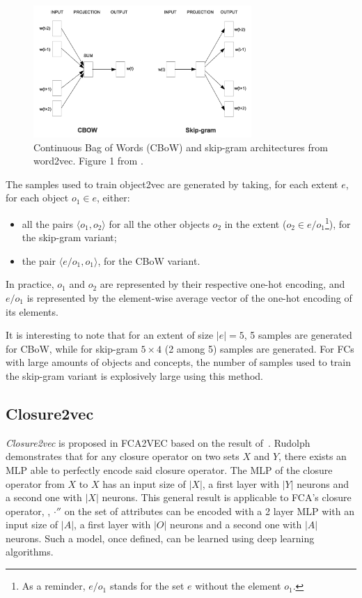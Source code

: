 \begin{figure}
    \centering
    \includegraphics[width=.9\textwidth, height=5cm, keepaspectratio]{Figures/Ch2/word2vec.png}
    \caption{Continuous Bag of Words (CBoW) and skip-gram architectures from word2vec. Figure 1 from \cite{word2vec:2013:mikolov}.}
    \label{fig:w2v}
\end{figure}

The samples used to train {object2vec} are generated by taking, for each extent $e$, for each object $o_1\in e$, either:
\begin{itemize}
    \item all the pairs $\langle o_1, o_2 \rangle$ for all the other objects $o_2$ in the extent ($o_2 \in e/o_1$\footnote{As a reminder, $e/o_1$ stands for the set $e$ without the element $o_1$.\label{fn:e-less-o}}), for the {skip-gram} variant;
    \item the pair $\langle e/o_1, o_1 \rangle$, for the {CBoW} variant.
\end{itemize}
In practice, $o_1$ and $o_2$ are represented by their respective one-hot encoding, and $e/o_1$ is represented by the element-wise average vector of the one-hot encoding of its elements.

It is interesting to note that for an extent of size $|e| = 5$, 5 samples are generated for {CBoW}, while for {skip-gram} $5\times 4$ (2 among 5) samples are generated. For FCs with large amounts of objects and concepts, the number of samples used to train the {skip-gram} variant is explosively large using this method.

\subsection{Closure2vec}\label{sec:fca2vec-c2v}
\textit{Closure2vec} is proposed in FCA2VEC based on the result of~\cite{encoding:2007:rudolph}.
Rudolph demonstrates that for any closure operator on two sets $X$ and $Y$, there exists an MLP able to perfectly encode said closure operator.
The MLP of the closure operator from $X$ to $X$ has an input size of $|X|$, a first layer with $|Y|$ neurons and a second one with $|X|$ neurons.
This general result is applicable to FCA's closure operator, \eg, $\cdot''$ on the set of attributes can be encoded with a 2 layer MLP with an input size of $|A|$, a first layer with $|O|$ neurons and a second one with $|A|$ neurons.
Such a model, once defined, can be learned using deep learning algorithms.

